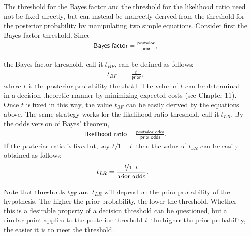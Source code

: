 \documentclass[
  10pt,
  dvipsnames,enabledeprecatedfontcommands]{scrartcl}
\begin{document}
The threshold for the Bayes factor and the threshold for the likelihood
ratio need not be fixed directly, but can instead be indirectly derived
from the threshold for the posterior probability by manipulating two
simple equations. Consider first the Bayes factor threshold. Since
\begin{align*}
\mathsf{ Bayes \: factor }=\frac{\mathsf{posterior }}{\mathsf{ prior}},
\end{align*}

\noindent the Bayes factor threshold, call it \(t_{BF}\), can be defined
as follows: \begin{align*}t_{BF} & = \frac{t}{\textsf{prior}},
\end{align*} where \(t\) is the posterior probability threshold. The
value of \(t\) can be determined in a decision-theoretic manner by
minimizing expected costs (see Chapter
11). Once \(t\) is fixed in this way, the
value \(t_{BF}\) can be easily derived by the equations above. The same
strategy works for the likelihood ratio threshold, call it \(t_{LR}\).
By the odds version of Bayes' theorem,
\begin{align*}\textsf{likelihood ratio}=\frac{\textsf{posterior odds}}{\textsf{prior odds}}.
\end{align*} If the posterior ratio is fixed at, say \(t/1-t\), then the
value of \(t_{LR}\) can be easily obtained as follows:
\begin{align*}t_{LR} & = \frac{\nicefrac{t}{1-t}}{\textsf{prior odds}}.
\end{align*}

\noindent Note that thresholds \(t_{BF}\) and \(t_{LR}\) will depend on
the prior probability of the hypothesis. The higher the prior
probability, the lower the threshold. Whether this is a desirable
property of a decision threshold can be questioned, but a similar point
applies to the posterior threshold \(t\): the higher the prior
probability, the easier it is to meet the threshold.
\end{document}

